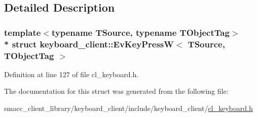 \subsection{Detailed Description}
\subsubsection*{template$<$typename T\+Source, typename T\+Object\+Tag$>$\\*
struct keyboard\+\_\+client\+::\+Ev\+Key\+Press\+W$<$ T\+Source, T\+Object\+Tag $>$}



Definition at line 127 of file cl\+\_\+keyboard.\+h.



The documentation for this struct was generated from the following file\+:\begin{DoxyCompactItemize}
\item 
smacc\+\_\+client\+\_\+library/keyboard\+\_\+client/include/keyboard\+\_\+client/\hyperlink{cl__keyboard_8h}{cl\+\_\+keyboard.\+h}\end{DoxyCompactItemize}
